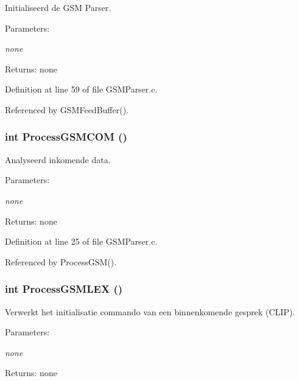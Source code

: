 Initialiseerd de GSM Parser. 

\begin{Desc}
\item[Parameters:]
\begin{description}
\item[{\em none}]\end{description}
\end{Desc}
\begin{Desc}
\item[Returns:]none \end{Desc}


Definition at line 59 of file GSMParser.c.

Referenced by GSMFeedBuffer().
\subsubsection{\setlength{\rightskip}{0pt plus 5cm}int ProcessGSMCOM ()}\label{_g_s_m_parser_8c_25fd6ccf5d8d48a31ad7195c2cb2fdcd}


Analyseerd inkomende data. 

\begin{Desc}
\item[Parameters:]
\begin{description}
\item[{\em none}]\end{description}
\end{Desc}
\begin{Desc}
\item[Returns:]none \end{Desc}


Definition at line 25 of file GSMParser.c.

Referenced by ProcessGSM().
\subsubsection{\setlength{\rightskip}{0pt plus 5cm}int ProcessGSMLEX ()}\label{_g_s_m_parser_8c_0530142dc64cdf24f8d2bee06e02a9ad}


Verwerkt het initialisatie commando van een binnenkomende gesprek (CLIP). 

\begin{Desc}
\item[Parameters:]
\begin{description}
\item[{\em none}]\end{description}
\end{Desc}
\begin{Desc}
\item[Returns:]none \end{Desc}



